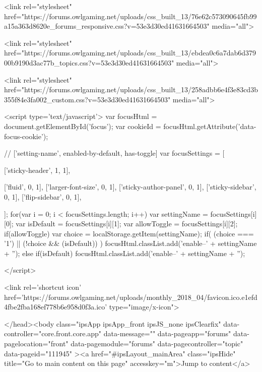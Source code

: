 	<link rel="stylesheet" href="https://forums.owlgaming.net/uploads/css_built_13/76e62c573090645fb99a15a363d8620e_forums_responsive.css?v=53e3d30ed41631664503" media="all">

	<link rel="stylesheet" href="https://forums.owlgaming.net/uploads/css_built_13/ebdea0c6a7dab6d37900b9190d3ac77b_topics.css?v=53e3d30ed41631664503" media="all">





<link rel="stylesheet" href="https://forums.owlgaming.net/uploads/css_built_13/258adbb6e4f3e83cd3b355f84e3fa002_custom.css?v=53e3d30ed41631664503" media="all">




		
<script type='text/javascript'>
var focusHtml = document.getElementById('focus');
var cookieId = focusHtml.getAttribute('data-focus-cookie');

//	['setting-name', enabled-by-default, has-toggle]
var focusSettings = [
	
 ['sticky-header', 1, 1],
	
	['fluid', 0, 1],
	['larger-font-size', 0, 1],
	['sticky-author-panel', 0, 1],
	['sticky-sidebar', 0, 1],
	['flip-sidebar', 0, 1],
	
	
]; 
for(var i = 0; i < focusSettings.length; i++) {
	var settingName = focusSettings[i][0];
	var isDefault = focusSettings[i][1];
	var allowToggle = focusSettings[i][2];
	if(allowToggle){
		var choice = localStorage.getItem(settingName);
		if( (choice === '1') || (!choice && (isDefault)) ){
			focusHtml.classList.add('enable--' + settingName + '');
		}
	} else if(isDefault){
		focusHtml.classList.add('enable--' + settingName + '');
	}
}


</script>

 
		
		
		

	
	<link rel='shortcut icon' href='https://forums.owlgaming.net/uploads/monthly_2018_04/favicon.ico.e1efd4fbe2fba168ef778b6e958d0f3a.ico' type="image/x-icon">

		
 
	</head><body class="ipsApp ipsApp_front ipsJS_none ipsClearfix" data-controller="core.front.core.app"  data-message=""  data-pageapp="forums" data-pagelocation="front" data-pagemodule="forums" data-pagecontroller="topic" data-pageid="111945"  ><a href="#ipsLayout_mainArea" class="ipsHide" title="Go to main content on this page" accesskey="m">Jump to content</a>
		
